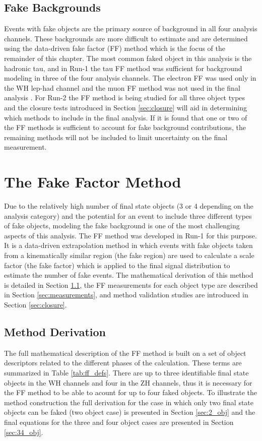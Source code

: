 \subsection{Fake Backgrounds}
Events with fake objects are the primary source of background in all four analysis channels. These backgrounds are more difficult to estimate and are determined using the data-driven fake factor (FF) method which is the focus of the remainder of this chapter. The most common faked object in this analysis is the hadronic tau, and in Run-1 the tau FF method was sufficient for background modeling in three of the four analysis channels. The electron FF was used only in the WH lep-had channel and the muon FF method was not used in the final analysis \cite{vh_run1_paper}. For Run-2 the FF method is being studied for all three object types and the closure tests introduced in Section \ref{sec:closure} will aid in determining which methods to include in the final analysis. If it is found that one or two of the FF methods is sufficient to account for fake background contributions, the remaining methods will not be included to limit uncertainty on the final measurement. 

\section{The Fake Factor Method}\label{sec:ff_method}
Due to the relatively high number of final state objects (3 or 4 depending on the analysis category) and the potential for an event to include three different types of fake objects, modeling the fake background is one of the most challenging aspects of this analysis. The FF method was  developed in Run-1 for this purpose. It is a data-driven extrapolation method in which events with fake objects taken from a kinematically similar region (the fake region) are used to calculate a scale factor (the fake factor) which is applied to the final signal distribution to estimate the number of fake events. The mathematical derivation of this method is detailed in Section \ref{sec:derivation}, the FF measurements for each object type are described in Section \ref{sec:measurements}, and method validation studies are introduced in Section \ref{sec:closure}.

\subsection{Method Derivation}\label{sec:derivation}
The full mathematical description of the FF method is built on a set of object descriptors related to the different phases of the calculation. These terms are summarized in Table \ref{tab:ff_defs}. There are up to three identifiable final state objects in the WH channels and four in the ZH channels, thus it is necessary for the FF method to be able to acount for up to four faked objects. To illustrate the method construction the full derivation for the case in which only two final state objects can be faked (two object case) is presented in Section \ref{sec:2_obj} and the final equations for the three and four object cases are presented in Section \ref{sec:34_obj}.

